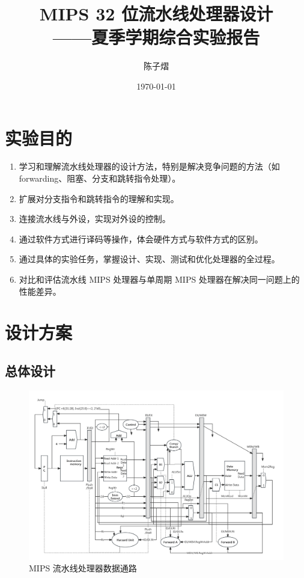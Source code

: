 \documentclass[a4paper]{article}  %
\begin{document}
\title{\textbf{MIPS 32 位流水线处理器设计}\\——夏季学期综合实验报告}
\author{陈子熠}
\date{\today}
\maketitle


\tableofcontents

\newpage

\section{实验目的}

\begin{enumerate}[1]
    \item 学习和理解流水线处理器的设计方法，特别是解决竞争问题的方法（如 forwarding、阻塞、分支和跳转指令处理）。
    \item 扩展对分支指令和跳转指令的理解和实现。
    \item 连接流水线与外设，实现对外设的控制。
    \item 通过软件方式进行译码等操作，体会硬件方式与软件方式的区别。
    \item 通过具体的实验任务，掌握设计、实现、测试和优化处理器的全过程。
    \item 对比和评估流水线 MIPS 处理器与单周期 MIPS 处理器在解决同一问题上的性能差异。
\end{enumerate}


\section{设计方案}

\subsection{总体设计}

\begin{figure}[ht]
    \centering
    \includegraphics[width=.8\textwidth]{asserts/MIPS32.png}
    \caption{
        MIPS 流水线处理器数据通路
    }\label{fig:pipeline_design}
\end{figure}
\end{document}
